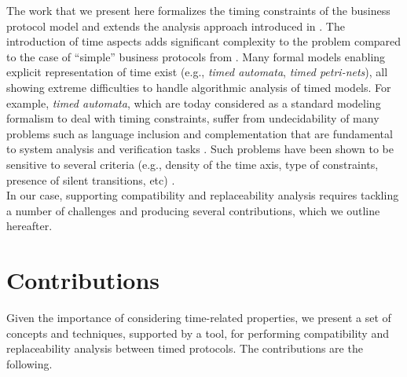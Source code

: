 The work that we present here formalizes the timing constraints of the business protocol model and extends the analysis approach introduced in \cite{BBFC04,BBFC04b,FTBB}. The introduction of time aspects adds significant complexity to the problem compared to the case of ``simple'' business protocols from \cite{FTBB}.
Many formal models enabling explicit representation of time exist (e.g., \emph{timed automata}, \emph{timed petri-nets}), all showing extreme difficulties to handle algorithmic analysis of timed models.
For example, \emph{timed automata}, which are today considered as a standard modeling formalism to deal with timing constraints, suffer from undecidability of many problems such as language inclusion and complementation that are fundamental to system analysis and verification tasks \cite{RADLD94}.
Such problems have been shown to be sensitive to several criteria (e.g., density of the time axis, type of constraints, presence of silent transitions, etc) \cite{RAPM04}. \\

In our case, supporting compatibility and replaceability analysis requires tackling a number of challenges and producing several contributions, which we outline hereafter.


\section{Contributions}


Given the importance of considering time-related properties, we present a set of concepts and techniques, supported by a tool, for performing compatibility and replaceability analysis between timed protocols. The contributions are the following.

